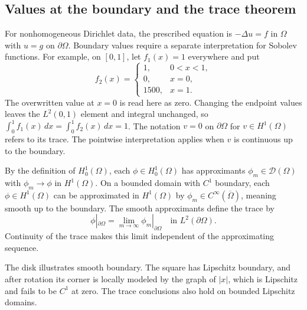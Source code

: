 \documentclass[11pt,a4paper]{article}
\begin{document}
\subsection{Values at the boundary and the trace theorem}

For nonhomogeneous Dirichlet data, the prescribed equation is
\(-\Delta u=f\) in \(\Omega\) with \(u=g\) on \(\partial\Omega\).
Boundary values require a separate interpretation for Sobolev
functions. For example, on \([0,1]\), let \(f_1(x)=1\) everywhere
and put
\[
  f_2(x)=
  \begin{cases}
    1, & 0<x<1,\\
    0, & x=0,\\
    1500, & x=1.
  \end{cases}
\]
The overwritten value at \(x=0\) is read here as zero.
Changing the endpoint values leaves the \(L^2(0,1)\) element
and integral unchanged, so
\(\int_0^1 f_1(x)\,dx=\int_0^1 f_2(x)\,dx=1\).
The notation \(v=0\) on \(\partial\Omega\) for \(v\in H^1(\Omega)\)
refers to its trace. The pointwise interpretation applies when
\(v\) is continuous up to the boundary.

By the definition of \(H_0^1(\Omega)\), each
\(\phi\in H_0^1(\Omega)\) has approximants
\(\phi_m\in\mathcal D(\Omega)\) with
\(\phi_m\to\phi\) in \(H^1(\Omega)\).
On a bounded domain with \(C^1\) boundary, each
\(\phi\in H^1(\Omega)\) can be approximated in \(H^1(\Omega)\)
by \(\phi_m\in C^\infty(\overline\Omega)\), meaning smooth up
to the boundary. The smooth approximants define the trace
by
\[
  \phi|_{\partial\Omega}
  =\lim_{m\to\infty}\phi_m|_{\partial\Omega}
  \quad\text{in }L^2(\partial\Omega).
\]
Continuity of the trace makes this limit independent of the
approximating sequence.

\begin{center}
\end{center}

The disk illustrates smooth boundary. The square has Lipschitz
boundary, and after rotation its corner is locally modeled by the
graph of \(|x|\), which is Lipschitz and fails to be \(C^1\) at zero.
The trace conclusions also hold on bounded Lipschitz domains.
\end{document}
